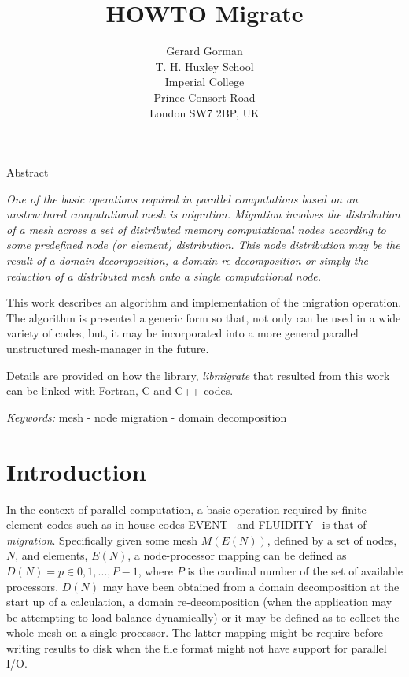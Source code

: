 \documentclass[11pt]{article}
\begin{document}
 

\date{}   

\title{HOWTO Migrate}

\author{
Gerard Gorman             \\
T. H. Huxley School        \\
Imperial College            \\
Prince Consort Road          \\
London SW7 2BP, UK            \\
}

\maketitle
\thispagestyle{empty}
        
\noindent
{\bf 

Abstract {\small\em One of the basic operations required in parallel
computations based on an unstructured computational mesh is {\it
migration}. Migration involves the distribution of a mesh across a set
of distributed memory computational nodes according to some predefined
node (or element) distribution. This node distribution may be the
result of a domain decomposition, a domain re-decomposition or simply
the reduction of a distributed mesh onto a single computational node.

This work describes an algorithm and implementation of the migration
operation. The algorithm is presented a generic form so that, not only
can be used in a wide variety of codes, but, it may be incorporated
into a more general parallel unstructured mesh-manager in the future.

Details are provided on how the library, {\it libmigrate} that
resulted from this work can be linked with Fortran, C and C++ codes.}
}

\vspace{0.5cm}
\noindent
{\it Keywords:}
 {\small mesh - node migration - domain decomposition}



\section{Introduction}
In the context of parallel computation, a basic operation required by
finite element codes such as in-house codes EVENT~\cite{EVENT} and
FLUIDITY~\cite{FLUIDITY} is that of {\it migration}. Specifically
given some mesh $M(E(N))$, defined by a set of nodes, $N$, and
elements, $E(N)$, a node-processor mapping can be defined as $D(N) = p
\in {0, 1,..., P-1}$, where $P$ is the cardinal number of the set of
available processors. $D(N)$ may have been obtained from a domain
decomposition at the start up of a calculation, a domain
re-decomposition (when the application may be attempting to
load-balance dynamically) or it may be defined as to collect the whole
mesh on a single processor. The latter mapping might be require before
writing results to disk when the file format might not have support
for parallel I/O.
\end{document}
